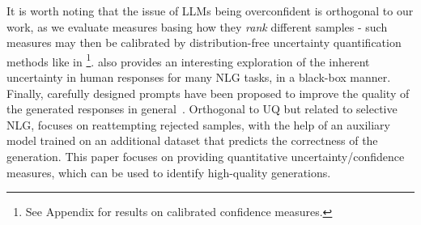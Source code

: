 It is worth noting that the issue of LLMs being overconfident \citep{mielke-etal-2022-reducing,si-etal-2022-examining,xiong2023llms} is orthogonal to our work, as we evaluate measures basing how they \textit{rank} different samples - such measures may then be calibrated by distribution-free uncertainty quantification methods like in \citet{schuster2022confident}\footnote{
See Appendix for results on calibrated confidence measures.
}.
\citet{giulianelli2023comes} also provides an interesting exploration of the inherent uncertainty in human responses for many NLG tasks, in a black-box manner.
Finally, carefully designed prompts have been proposed to improve the quality of the generated responses in general~\citep{Zhou2023NavigatingTG,si2023prompting,wei2022chain}.
Orthogonal to UQ but related to selective NLG, \cite{varshney-baral-2023-post} focuses on reattempting rejected samples, with the help of an auxiliary model trained on an additional dataset that predicts the correctness of the generation.
This paper focuses on providing quantitative uncertainty/confidence measures, which can be used to identify high-quality generations. 
